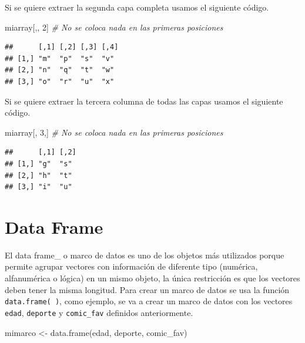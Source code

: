 \documentclass[
]{book}
\newenvironment{Shaded}{\begin{snugshade}}{\end{snugshade}}
\newcommand{\CommentTok}[1]{\textcolor[rgb]{0.56,0.35,0.01}{\textit{#1}}}
\newcommand{\DecValTok}[1]{\textcolor[rgb]{0.00,0.00,0.81}{#1}}
\newcommand{\FunctionTok}[1]{\textcolor[rgb]{0.00,0.00,0.00}{#1}}
\newcommand{\NormalTok}[1]{#1}
\newcommand{\OtherTok}[1]{\textcolor[rgb]{0.56,0.35,0.01}{#1}}
\begin{document}
Si se quiere extraer la segunda capa completa usamos el siguiente código.

\begin{Shaded}
\begin{Highlighting}[]
\NormalTok{miarray[,, }\DecValTok{2}\NormalTok{]  }\CommentTok{\# No se coloca nada en las primeras posiciones}
\end{Highlighting}
\end{Shaded}

\begin{verbatim}
##      [,1] [,2] [,3] [,4]
## [1,] "m"  "p"  "s"  "v" 
## [2,] "n"  "q"  "t"  "w" 
## [3,] "o"  "r"  "u"  "x"
\end{verbatim}

Si se quiere extraer la tercera columna de todas las capas usamos el siguiente código.

\begin{Shaded}
\begin{Highlighting}[]
\NormalTok{miarray[, }\DecValTok{3}\NormalTok{,]  }\CommentTok{\# No se coloca nada en las primeras posiciones}
\end{Highlighting}
\end{Shaded}

\begin{verbatim}
##      [,1] [,2]
## [1,] "g"  "s" 
## [2,] "h"  "t" 
## [3,] "i"  "u"
\end{verbatim}

\hypertarget{data-frame}{%
\section{\texorpdfstring{Data Frame  }{Data Frame  }}\label{data-frame}}

El data frame\_ o marco de datos es uno de los objetos más utilizados porque permite agrupar vectores con información de diferente tipo (numérica, alfanumérica o lógica) en un mismo objeto, la única restricción es que los vectores deben tener la misma longitud. Para crear un marco de datos se usa la función \texttt{data.frame(\ )}, como ejemplo, se va a crear un marco de datos con los vectores \texttt{edad}, \texttt{deporte} y \texttt{comic\_fav} definidos anteriormente.

\begin{Shaded}
\begin{Highlighting}[]
\NormalTok{mimarco }\OtherTok{\textless{}{-}} \FunctionTok{data.frame}\NormalTok{(edad, deporte, comic\_fav)}
\end{Highlighting}
\end{Shaded}
\end{document}
